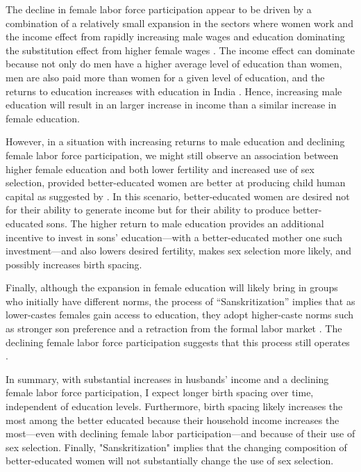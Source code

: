 \documentclass[12pt,letterpaper]{article}
\begin{document}
The decline in female labor force participation appear to be driven by a combination
of a relatively small expansion in the sectors where women work and the income effect 
from rapidly increasing male wages and education dominating the substitution effect from 
higher female wages \citep{Klasen2015,Bhargava2018}.
The income effect can dominate because not only do men have a higher average level of 
education than women, men are also paid more than women for a given level of education, 
and the returns to education increases with education in India \citep{Agrawal2011}.
Hence, increasing male education will result in an larger increase in income than a 
similar increase in female education.

However, in a situation with increasing returns to male education and declining female labor 
force participation, we might still observe an association between higher female education 
and both lower fertility and increased use of sex selection, provided better-educated women 
are better at producing child human capital as suggested by \citet{Behrman1999}.
In this scenario, better-educated women are desired not for their ability to generate
income but for their ability to produce better-educated sons.
The higher return to male education provides an additional incentive to invest in sons'
education---with a better-educated mother one such investment---and also lowers desired 
fertility, makes sex selection more likely, and possibly increases birth spacing.

Finally, although the expansion in female education will likely bring in groups who 
initially have different norms, the process of ``Sanskritization'' implies that as 
lower-castes females gain access to education, they adopt higher-caste norms such as stronger son 
preference and a retraction from the formal labor market \citep{Srinivas1956}.
The declining female labor force participation suggests that this process still 
operates \citep{Abraham2013,Chatterjee2018}.

In summary, with substantial increases in husbands' income and a declining female labor 
force participation, I expect longer birth spacing over time, independent of education 
levels.
Furthermore, birth spacing likely increases the most among the better educated 
because their household income increases the most---even with declining female labor 
participation---and because of their use of sex selection.
Finally, "Sanskritization" implies that the changing composition of better-educated
women will not substantially change the use of sex selection.
\end{document}
